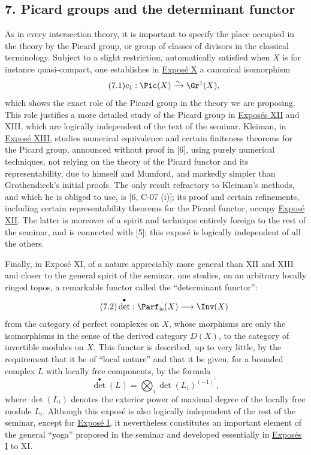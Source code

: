\subsection*{7. Picard groups and the determinant functor}
As in every intersection theory, it is important to specify the place occupied in the theory by the Picard group, or group of classes of divisors in the classical terminology. Subject to a slight restriction, automatically satisfied when $X$ is for instance quasi-compact, one establishes in \hyperlink{sga6.e10.expose}{Expos\'e X} a canonical isomorphism
\begin{equation}\tag{7.1}
c_1:\Pic(X)\xrightarrow{\sim}\Gr^1(X),
\end{equation}
which shows the exact role of the Picard group in the theory we are proposing. This role justifies a more detailed study of the Picard group in \hyperlink{sga6.e12.expose}{Expos\'es XII} and XIII, which are logically independent of the text of the seminar. Kleiman, in \hyperlink{sga6.e13.expose}{Expos\'e XIII}, studies numerical equivalence and certain finiteness theorems for the Picard group, announced without proof in [6], using purely numerical techniques, not relying on the theory of the Picard functor and its representability, due to himself and Mumford, and markedly simpler than Grothendieck's initial proofs. The only result refractory to Kleiman's methods, and which he is obliged to use, is [6, C-07 (i)]; its proof and certain refinements, including certain representability theorems for the Picard functor, occupy \hyperlink{sga6.e12.expose}{Expos\'e XII}. The latter is moreover of a spirit and technique entirely foreign to the rest of the seminar, and is connected with [5]; this expos\'e is logically independent of all the others.

Finally, in Expos\'e XI, of a nature appreciably more general than XII and XIII and closer to the general spirit of the seminar, one studies, on an arbitrary locally ringed topos, a remarkable functor called the ``determinant functor'':
\begin{equation}\tag{7.2}
\det^\bullet:\Parf_{\mathrm{is}}(X)\longrightarrow \Inv(X)
\end{equation}
from the category of perfect complexes on $X$, whose morphisms are only the isomorphisms in the sense of the derived category $D(X)$, to the category of invertible modules on $X$. This functor is described, up to very little, by the requirement that it be of ``local nature'' and that it be given, for a bounded complex $L$ with locally free components, by the formula
\begin{equation}\tag{7.3}
\det^\bullet(L)=\bigotimes_i \det(L_i)^{(-1)^i},
\end{equation}
where $\det(L_i)$ denotes the exterior power of maximal degree of the locally free module $L_i$. Although this expos\'e is also logically independent of the rest of the seminar, except for \hyperlink{sga6.e01.expose}{Expos\'e I}, it nevertheless constitutes an important element of the general ``yoga'' proposed in the seminar and developed essentially in \hyperlink{sga6.e01.expose}{Expos\'es I} to XI.

